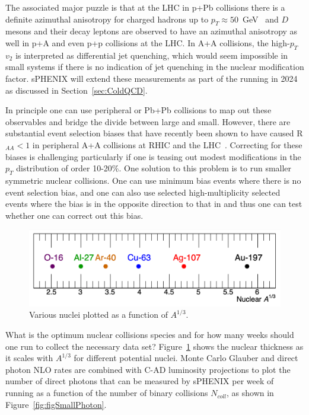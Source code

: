 The associated major puzzle is that at the LHC in p+Pb collisions there is a definite azimuthal anisotropy for charged hadrons up to $p_{T} \approx 50$~GeV~\cite{Aad:2019ajj} and $D$ mesons and their decay leptons are observed to have an azimuthal anisotropy as well in p+A and even p+p collisions at the LHC.   In A+A collisions, the high-$p_T$ $v_{2}$ is interpreted as differential jet quenching, which would seem impossible in small systems if there is no indication of jet quenching in the nuclear modification factor.   sPHENIX will extend these measurements as part of the \pau running in 2024 as discussed in Section~\ref{sec:ColdQCD}.

In principle one can use peripheral \auau or Pb+Pb collisions to map out these observables and bridge the divide between large and small.   However, there are substantial event selection biases that have recently been shown to have caused R$_{AA} < 1$ in peripheral A+A collisions at RHIC and the LHC~\cite{Morsch:2017brb}.    Correcting for these biases is challenging particularly if one is teasing out modest modifications in the $p_{T}$ distribution of order 10-20\%.    One solution to this problem is to run smaller symmetric nuclear collisions.   One can use minimum bias events where there is no event selection bias, and one can also use selected high-multiplicity selected events where the bias is in the opposite direction to that in \auau and thus one can test whether one can correct out this bias.

\begin{figure}[h]
    \centering
    \includegraphics[width=0.85\linewidth]{figs/figure_A.png}
    \caption{Various nuclei plotted as a function of $A^{1/3}$.}
    \label{fig:figA}
\end{figure}

What is the optimum nuclear collisions species and for how many weeks should one run to collect the necessary data set?    Figure~\ref{fig:figA} shows the nuclear thickness as it scales with $A^{1/3}$ for different potential nuclei.   Monte Carlo Glauber and direct photon NLO rates are combined with C-AD luminosity projections to plot the number of direct photons 
that can be measured by sPHENIX per week of running as a function of the number of binary collisions $N_{coll}$, as shown in Figure~\ref{fig:figSmallPhoton}.

